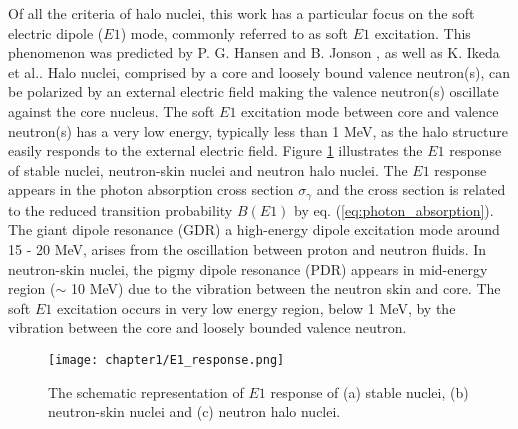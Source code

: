 Of all the criteria of halo nuclei, this work has a particular focus on the soft electric dipole ($E1$) mode, commonly referred to as soft $E1$ excitation. This phenomenon was predicted by P. G. Hansen and B. Jonson \cite{HansenandJonson}, as well as K. Ikeda et al.\cite{Ikeda}. Halo nuclei, comprised by a core and loosely bound valence neutron(s), can be polarized by an external electric field making the valence neutron(s) oscillate against the core nucleus. The soft $E1$ excitation mode between core and valence neutron(s) has a very low energy, typically less than 1 MeV, as the halo structure easily responds to the external electric field. Figure \ref{fig:E1_response} illustrates the $E1$ response of stable nuclei, neutron-skin nuclei and neutron halo nuclei. The $E1$ response appears in the photon absorption cross section $\sigma_\gamma$ and the  cross section is related to the reduced transition probability $B(E1)$ by eq. (\ref{eq:photon_absorption}). The giant dipole resonance (GDR) a high-energy dipole excitation mode around 15 - 20 MeV, arises from the oscillation between proton and neutron fluids. In neutron-skin nuclei, the pigmy dipole resonance (PDR) appears in mid-energy region ($\sim$ 10 MeV) due to the vibration between the neutron skin and core. The soft $E1$ excitation occurs in very low energy region, below 1 MeV, by the vibration between the core and loosely bounded valence neutron.
\begin{figure}
    \centering
    \texttt{[image: chapter1/E1\_response.png]}
    \caption{The schematic representation of $E1$ response of (a) stable nuclei, (b) neutron-skin nuclei and (c) neutron halo nuclei. \cite{Nakamura17}}
    \label{fig:E1_response}
\end{figure}

